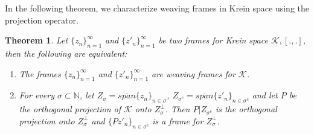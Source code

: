 \documentclass[article,12pt]{amsart}
\newtheorem{thm}{Theorem}[section]
\begin{document}
In the following theorem, we characterize weaving frames in Krein space using the projection operator.

\begin{thm}
	
	Let $\{z_n\}_{n=1}^\infty$ and $\{z'_n\}_{n=1}^\infty$ be two frames for Krein space $\mathcal{K},[., .]$, then the following are equivalent:
	
	\begin{enumerate}
	
	\item  The frames $\{z_n\}_{n=1}^\infty$ and $\{z'_n\}_{n=1}^\infty$ are weaving frames for $\mathcal{K}$.
	
\item	 For every $\sigma\subset \mathbb{N}$, let $Z_\sigma = \overline{span}\{z_n\}_{n \in\sigma}$,  $Z_{\sigma^{c}}= \overline{span}\{z'_n\}_{n \in\sigma^{c}}$ and let $P$ be the orthogonal projection of $\mathcal{K}$ onto $Z^\perp_{\sigma}$. Then $P|Z_{\sigma^{c}}$ is the orthogonal projection onto $Z^\perp_\sigma$ and $\{Pz'_n\}_ {n \in \sigma^c}$ is a frame for $Z^\perp_{\sigma}$.
		\end{enumerate}
\end{thm}
\end{document}
